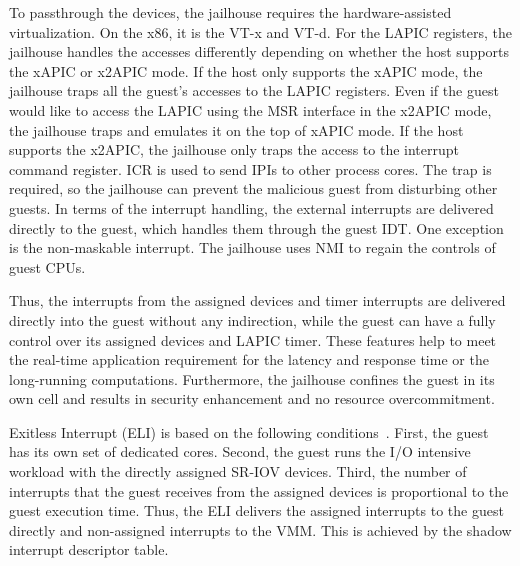 To passthrough the devices, the jailhouse requires the
hardware-assisted virtualization. On the x86, it is the VT-x
and VT-d. For the LAPIC registers, the jailhouse handles the
accesses differently depending on whether the host supports
the xAPIC or x2APIC mode. If the host only supports the xAPIC
mode, the jailhouse traps all the guest's accesses to the
LAPIC registers. Even if the guest would like to access the
LAPIC using the MSR interface in the x2APIC mode, the
jailhouse traps and emulates it on the top of xAPIC mode. If
the host supports the x2APIC, the jailhouse only traps the
access to the interrupt command register. ICR is used to send
IPIs to other process cores. The trap is required, so the
jailhouse can prevent the malicious guest from disturbing
other guests. In terms of the interrupt handling, the external
interrupts are delivered directly to the guest, which handles
them through the guest IDT. One exception is the non-maskable
interrupt. The jailhouse uses NMI to regain the controls of
guest CPUs.

Thus, the interrupts from the assigned devices and timer
interrupts are delivered directly into the guest without any
indirection, while the guest can have a fully control over its
assigned devices and LAPIC timer. These features help to meet
the real-time application requirement for the latency and
response time or the long-running computations. Furthermore,
the jailhouse confines the guest in its own cell and results
in security enhancement and no resource overcommitment.


Exitless Interrupt (ELI) is based on the following
conditions~\cite{amit:2015}. First, the guest has its own set
of dedicated cores. Second, the guest runs the I/O intensive
workload with the directly assigned SR-IOV devices. Third, the
number of interrupts that the guest receives from the assigned
devices is proportional to the guest execution time. Thus, the
ELI delivers the assigned interrupts to the guest directly and
non-assigned interrupts to the VMM. This is achieved by the
shadow interrupt descriptor table.

